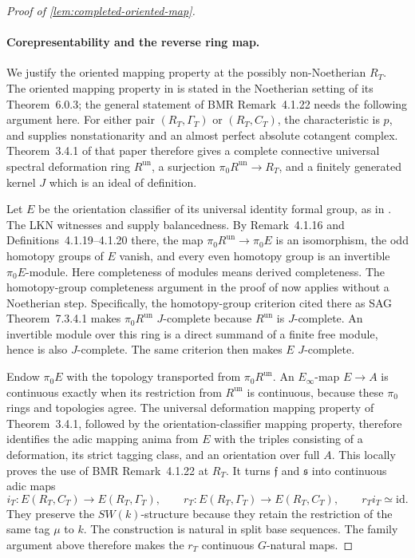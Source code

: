 \documentclass[11pt]{article}
\numberwithin{equation}{section}
\theoremstyle{definition}
\theoremstyle{remark}
\begin{document}
\begin{proof}[Proof of \cref{lem:completed-oriented-map}]
\paragraph{Corepresentability and the reverse ring map.}
We justify the oriented mapping property at the possibly
non-Noetherian \(R_T\). The oriented mapping property in
\cite[Remark~6.0.7]{LurieEllipticII2018} is stated in the Noetherian
setting of its Theorem~6.0.3; the general statement of BMR
Remark~4.1.22 needs the following argument here. For either pair
\((R_T,\Gamma_T)\) or \((R_T,C_T)\), the characteristic is \(p\), and
\cite[Remark~3.4.2]{LurieEllipticII2018} supplies nonstationarity and an
almost perfect absolute cotangent complex. Theorem~3.4.1 of that paper
therefore gives a complete connective universal spectral deformation
ring \(R^{\mathrm{un}}\), a surjection
\(\pi_0R^{\mathrm{un}}\to R_T\), and a finitely generated kernel \(J\)
which is an ideal of definition.

Let \(E\) be the orientation classifier of its universal identity formal
group, as in \cite[Construction~4.1.17 and Definition~4.1.20]{BMR2026}.
The LKN witnesses and \cite[Definition~4.2.1 and Theorem~4.3.8]{BMR2026}
supply balancedness. By Remark~4.1.16 and Definitions~4.1.19--4.1.20
there, the map \(\pi_0R^{\mathrm{un}}\to\pi_0E\) is an isomorphism, the
odd homotopy groups of \(E\) vanish, and every even homotopy group is an
invertible \(\pi_0E\)-module. Here completeness of modules means
derived completeness. The homotopy-group completeness argument
in the proof of \cite[Corollary~6.0.5]{LurieEllipticII2018} now applies
without a Noetherian step. Specifically, the homotopy-group criterion
cited there as SAG Theorem~7.3.4.1 makes \(\pi_0R^{\mathrm{un}}\) \(J\)-complete because
\(R^{\mathrm{un}}\) is \(J\)-complete. An invertible module over this
ring is a direct summand of a finite free module, hence is also
\(J\)-complete. The same criterion then makes \(E\) \(J\)-complete.

Endow \(\pi_0E\) with the topology transported from
\(\pi_0R^{\mathrm{un}}\). An \(E_\infty\)-map \(E\to A\) is continuous
exactly when its restriction from \(R^{\mathrm{un}}\) is continuous,
because these \(\pi_0\) rings and topologies agree. The universal
deformation mapping property of Theorem~3.4.1, followed by the
orientation-classifier mapping property, therefore identifies the adic
mapping anima from \(E\) with the triples consisting of a deformation,
its strict tagging class, and an orientation over full \(A\). This
locally proves the use of BMR Remark~4.1.22 at \(R_T\).
It turns \(\mathfrak f\) and \(\mathfrak s\) into continuous adic maps
\[
 i_T:E(R_T,C_T)\longrightarrow E(R_T,\Gamma_T),\qquad
 r_T:E(R_T,\Gamma_T)\longrightarrow E(R_T,C_T),
 \qquad r_Ti_T\simeq\mathrm{id}.
\]
They preserve the \(SW(k)\)-structure because they retain the restriction
of the same tag \(\mu\) to \(k\). The construction is natural in split
base sequences. The family argument above therefore makes the \(r_T\)
continuous \(G\)-natural maps.


\end{proof}
\end{document}
